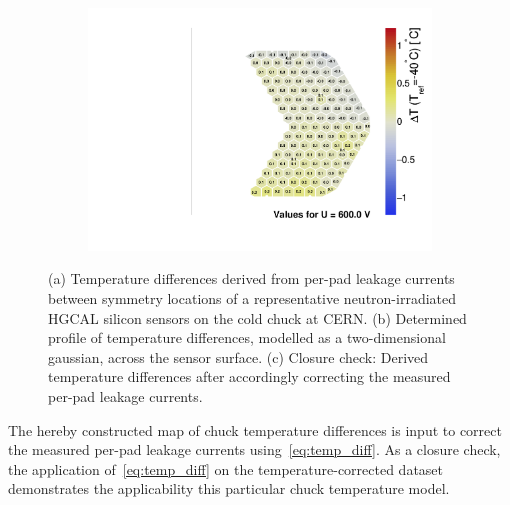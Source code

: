\begin{figure}
\begin{subfigure}[b]{0.32\textwidth}
		\includegraphics[width=0.999\textwidth]{plots/chuck_temp_correction/Spring2021_ALPS_chucktempcorrected.pdf}
		\subcaption{
		}
		\label{plot:chucktemp_after}
	\end{subfigure}
	\caption{
		(a) Temperature differences derived from per-pad leakage currents between symmetry locations of a representative neutron-irradiated HGCAL silicon sensors on the cold chuck at CERN.
		(b) Determined profile of temperature differences, modelled as a two-dimensional gaussian, across the sensor surface.
		(c) Closure check: Derived temperature differences after accordingly correcting the measured per-pad leakage currents.
	}
\end{figure}
The hereby constructed map of chuck temperature differences is input to correct the measured per-pad leakage currents using~\ref{eq:temp_diff}.
As a closure check, the application of~\ref{eq:temp_diff} on the temperature-corrected dataset demonstrates the applicability this particular chuck temperature model.

